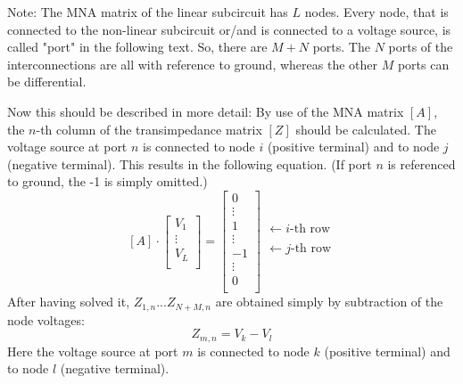 \addvspace{12pt}

Note: The MNA matrix of the linear subcircuit has $L$ nodes.
Every node, that is connected to the non-linear subcircuit or/and is
connected to a voltage source, is called "port" in the following text.
So, there are $M+N$ ports. The $N$ ports of the interconnections are
all with reference to ground, whereas the other $M$ ports can be
differential.

\addvspace{12pt}

Now this should be described in more detail: By use of the MNA matrix
$[A]$, the $n$-th column of the transimpedance matrix $[Z]$ should be
calculated. The voltage source at port $n$ is connected to node $i$
(positive terminal) and to node $j$ (negative terminal). This results
in the following equation. (If port $n$ is referenced to ground, the
-1 is simply omitted.)
\begin{equation}
\label{eqn:HBtrans}
[A]\cdot
\begin{bmatrix}
V_1\\
\vdots\\
V_L\\
\end{bmatrix}
=
\begin{bmatrix}
0\\
\vdots\\
1\\
\vdots\\
-1\\
\vdots\\
0\\
\end{bmatrix}
\begin{matrix}
 \\
 \\
\leftarrow i\text{-th row}\\
 \\
\leftarrow j\text{-th row}\\
 \\
 \\
\end{matrix}
\end{equation}
After having solved it, $Z_{1,n}$...$Z_{N+M,n}$ are obtained
simply by subtraction of the node voltages:
\begin{equation}
Z_{m,n} = V_k - V_l
\end{equation}
Here the voltage source at port $m$ is connected to node $k$
(positive terminal) and to node $l$ (negative terminal).

\addvspace{12pt}

